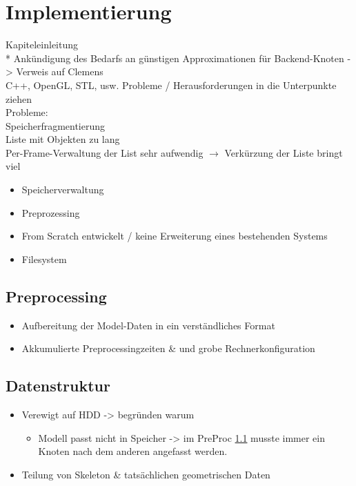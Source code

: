 
\chapter{Implementierung}
\label{chap:impl}
Kapiteleinleitung\\*
Ankündigung des Bedarfs an günstigen Approximationen für Backend-Knoten -> Verweis auf Clemens\\
C++, OpenGL, STL, usw.
Probleme / Herausforderungen in die Unterpunkte ziehen\\
Probleme:\\
Speicherfragmentierung\\
Liste mit Objekten zu lang\\
Per-Frame-Verwaltung der List sehr aufwendig $\rightarrow$ Verkürzung der Liste bringt viel
\begin{itemize}
 \item Speicherverwaltung
 \item Preprozessing
 \item From Scratch entwickelt / keine Erweiterung eines bestehenden Systems
 \item Filesystem
\end{itemize}

\section{Preprocessing}
\label{sec:impl:preprocessing}
%
\begin{itemize}
 \item Aufbereitung der Model-Daten in ein verständliches Format
 \item Akkumulierte Preprocessingzeiten \& und grobe Rechnerkonfiguration
\end{itemize}

\section{Datenstruktur}
\label{sec:impl:datenstruktur}
%
\begin{itemize}
 \item Verewigt auf HDD -> begründen warum
 \begin{itemize}
  \item Modell passt nicht in Speicher -> im PreProc \ref{sec:impl:preprocessing} musste immer ein Knoten nach dem anderen angefasst werden.
 \end{itemize}

 \item Teilung von Skeleton \& tatsächlichen geometrischen Daten
\end{itemize}

